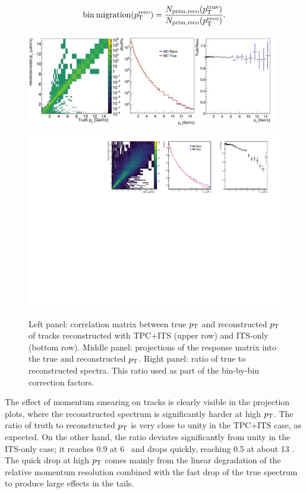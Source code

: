 \begin{equation}\label{eq:bin_migration}
\mathrm{bin\:migration} (p_{\mathrm{T}}^{\mathrm{reco}}) = \frac{N_{\mathrm{prim,reco}}(p_{\mathrm{T}}^{\mathrm{true}})}{N_{\mathrm{prim,reco}}(p_{\mathrm{T}}^{\mathrm{reco}})}.
\end{equation}

\begin{figure}[h!]
\includegraphics[width=0.98\textwidth]{Data_Analysis/Tracking/Matrix_tracking_tpc_MBMC_0GeV15GeV_dNdPt.pdf}\\
\includegraphics[width=1.0\textwidth]{Data_Analysis/Tracking/Matrix_tracking_its_MBMC_0GeV15GeV_dNdPt.pdf}

\caption{Left panel: correlation matrix between true $p_{\mathrm{T}}$ and reconstructed $p_{\mathrm{T}}$ of tracks reconstructed with TPC+ITS (upper row) and ITS-only (bottom row). Middle panel: projections of the response matrix into the true and reconstructed $p_{\mathrm{T}}$. Right panel: ratio of true to reconstructed spectra. This ratio used as part of the bin-by-bin correction factors.}
\label{fig:responseMatrixTPC}
\end{figure}

The effect of momentum smearing on tracks is clearly visible in the projection plots, where the reconstructed spectrum is significantly harder at high $p_{\mathrm{T}}$. The ratio of truth to reconstructed $p_{\mathrm{T}}$ is very close to unity in the TPC+ITS case, as expected. On the other hand, the ratio deviates significantly from unity in the ITS-only case; it reaches 0.9 at 6 \GeVc~and drops quickly, reaching 0.5 at about 13 \GeVc. The quick drop at high $p_{\mathrm{T}}$ comes mainly from the linear degradation of the relative momentum resolution combined with the fast drop of the true spectrum to produce large effects in the tails. 

